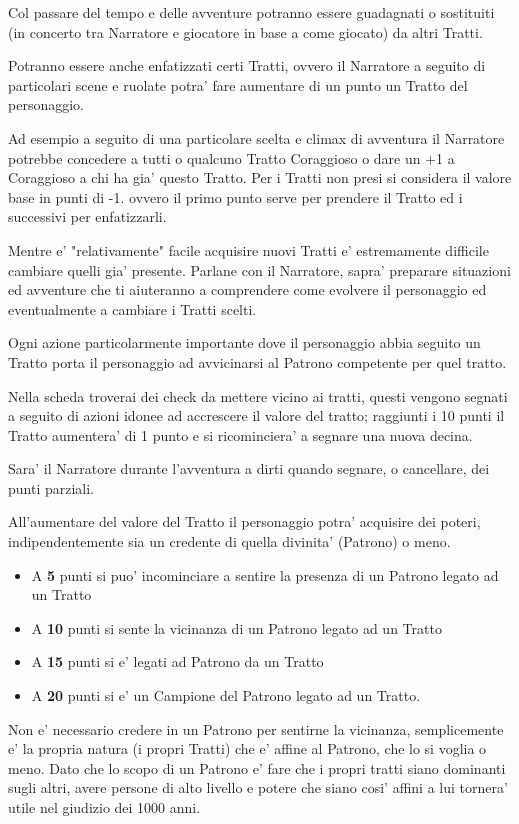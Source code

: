 \documentclass[a4paper,11pt,twoside,openany]{book}
\begin{document}
Col passare del tempo e delle avventure potranno essere guadagnati o sostituiti (in concerto tra Narratore e giocatore in base a come giocato) da altri Tratti.

Potranno essere anche enfatizzati certi Tratti, ovvero il Narratore a seguito di particolari scene e ruolate potra' fare aumentare di un punto un Tratto del personaggio.

Ad esempio a seguito di una particolare scelta e climax di avventura il Narratore potrebbe concedere a tutti o qualcuno Tratto Coraggioso o dare un +1 a Coraggioso a chi ha gia' questo Tratto. Per i Tratti non presi si considera il valore base in punti di -1. ovvero il primo punto serve per prendere il Tratto ed i successivi per enfatizzarli.

Mentre e' "relativamente" facile acquisire nuovi Tratti e' estremamente difficile cambiare quelli gia' presente. Parlane con il Narratore, sapra' preparare situazioni ed avventure che ti aiuteranno a comprendere come evolvere il personaggio ed eventualmente a cambiare i Tratti scelti.

Ogni azione particolarmente importante dove il personaggio abbia seguito un Tratto porta il personaggio ad avvicinarsi al Patrono competente per quel tratto.

Nella scheda troverai dei check da mettere vicino ai tratti, questi vengono segnati a seguito di azioni idonee ad accrescere il valore del tratto; raggiunti i 10 punti il Tratto aumentera' di 1 punto e si ricominciera' a segnare una nuova decina.

Sara' il Narratore durante l'avventura a dirti quando segnare, o cancellare, dei punti parziali.

All'aumentare del valore del Tratto il personaggio potra' acquisire dei poteri, indipendentemente sia un credente di quella divinita' (Patrono) o meno.

\begin{itemize}
	\item A \textbf{5} punti si puo' incominciare a sentire la presenza di un Patrono
legato ad un Tratto
	\item A \textbf{10} punti si sente la vicinanza di un Patrono legato ad un Tratto
	\item A \textbf{15} punti si e' legati ad Patrono da un Tratto
	\item A \textbf{20} punti si e' un Campione del Patrono legato ad un Tratto.
\end{itemize}

Non e' necessario credere in un Patrono per sentirne la vicinanza, semplicemente e' la propria natura (i propri Tratti) che e' affine al Patrono, che lo si voglia o meno.
Dato che lo scopo di un Patrono e' fare che i propri tratti siano dominanti sugli altri, avere persone di alto livello e potere che siano cosi' affini a lui tornera' utile nel giudizio dei   1000 anni.
\end{document}

